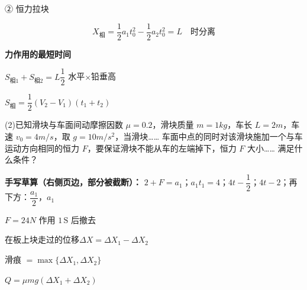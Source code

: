 \noindent ② 恒力拉块

\[
X_{\text{相}}=\frac12a_1t_0^2-\frac12a_2t_0^2=L\quad\text{时分离}
\]

\textbf{力作用的最短时间}

\noindent $S_{\text{相}1}+S_{\text{相}2}=L$\quad $\dfrac12$ 水平$\times$铅垂高

\noindent $S_{\text{相}}=\dfrac12(V_2-V_1)(t_1+t_2)$

\begin{problem}[粘贴印刷题·第(2)问]
(2)已知滑块与车面间动摩擦因数 $\mu=0.2$，滑块质量 $m=1\unit{kg}$，车长 $L=2\unit{m}$，车速 $v_0=4\unit{m/s}$，取 $g=10\unit{m/s^2}$，当滑块……%
车面中点的同时对该滑块施加一个与车运动方向相同的恒力 $F$，要保证滑块不能从车的左端掉下，恒力 $F$ 大小……%
满足什么条件？

\medskip
\noindent\textbf{手写草算（右侧页边，部分被截断）：}
$2+F=a_1$；\quad $a_1t_1=4$；\quad $4t-\dfrac12$；\quad $4t-2$；\quad 再下方：$\dfrac{a_1}{2}$，$a_1$%
\end{problem}

\begin{problem}
$F=24\unit{N}$ 作用 $1\,\mathrm{S}$ 后撤去
\begin{solution}
在板上块走过的位移\quad $\Delta X=\Delta X_1-\Delta X_2$

滑痕 $=\max\{\Delta X_1,\Delta X_2\}$

$Q=\mu mg(\Delta X_1+\Delta X_2)$
\end{solution}
\end{problem}

